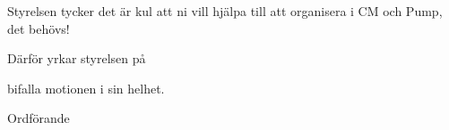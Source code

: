 \documentclass[../_main/handlingar.tex]{subfiles}
\begin{document}
\motionssvar

Styrelsen tycker det är kul att ni vill hjälpa till att organisera i CM och Pump, det behövs!

Därför yrkar styrelsen på
\begin{attsatser}
    \att bifalla motionen i sin helhet.
\end{attsatser}

\begin{signatures}{1}
    \ist
    \signature{Erik Månsson}{Ordförande}
\end{signatures}
\end{document}
